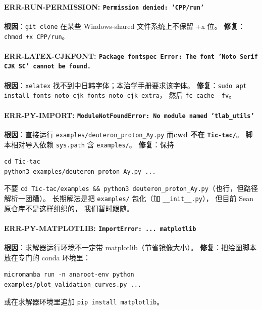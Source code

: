 \paragraph{ERR-RUN-PERMISSION: \texttt{Permission denied: 'CPP/run'}}
\textbf{根因}：\texttt{git clone} 在某些 Windows-shared 文件系统上不保留 +x 位。
\textbf{修复}：\texttt{chmod +x CPP/run}。

\paragraph{ERR-LATEX-CJKFONT: \texttt{Package fontspec Error: The font 'Noto Serif CJK SC' cannot be found.}}
\textbf{根因}：\texttt{xelatex} 找不到中日韩字体；本治学手册要求该字体。
\textbf{修复}：\texttt{sudo apt install fonts-noto-cjk fonts-noto-cjk-extra}，
然后 \texttt{fc-cache -fv}。

\paragraph{ERR-PY-IMPORT: \texttt{ModuleNotFoundError: No module named 'tlab\_utils'}}
\textbf{根因}：直接运行 \texttt{examples/deuteron\_proton\_Ay.py} 而\textbf{cwd 不在 \texttt{Tic-tac/}}。
脚本相对导入依赖 \texttt{sys.path} 含 \texttt{examples/}。
\textbf{修复}：保持
\begin{lstlisting}[style=config]
cd Tic-tac
python3 examples/deuteron_proton_Ay.py ...
\end{lstlisting}
不要 \texttt{cd Tic-tac/examples \&\& python3 deuteron\_proton\_Ay.py}（也行，但路径解析一团糟）。
长期解法是把 \texttt{examples/} 包化（加 \texttt{\_\_init\_\_.py}），
但目前 Sean 原仓库不是这样组织的，
我们暂时跟随。

\paragraph{ERR-PY-MATPLOTLIB: \texttt{ImportError: ... matplotlib}}
\textbf{根因}：求解器运行环境不一定带 matplotlib（节省镜像大小）。
\textbf{修复}：把绘图脚本放在专门的 conda 环境里：
\begin{lstlisting}[style=config]
micromamba run -n anaroot-env python examples/plot_validation_curves.py ...
\end{lstlisting}
或在求解器环境里追加 \texttt{pip install matplotlib}。

